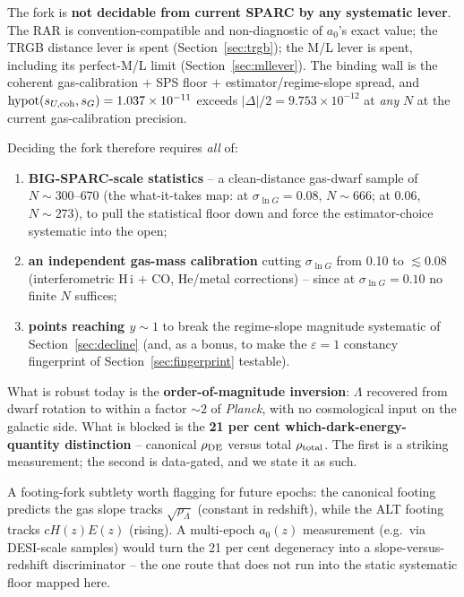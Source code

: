 \documentclass[fleqn,usenatbib]{mnras}
\begin{document}
The fork is \textbf{not decidable from current SPARC by any systematic lever}. The RAR is convention-compatible and non-diagnostic of $a_0$'s exact value; the TRGB distance lever is spent (Section~\ref{sec:trgb}); the M/L lever is spent, including its perfect-M/L limit (Section~\ref{sec:mllever}). The binding wall is the coherent gas-calibration $+$ SPS floor $+$ estimator/regime-slope spread, and $\mathrm{hypot}(s_{U,\rm coh},s_G)=1.037\times10^{-11}$ exceeds $|\Delta|/2=9.753\times10^{-12}$ at \emph{any} $N$ at the current gas-calibration precision.

Deciding the fork therefore requires \emph{all} of:
\begin{enumerate}
\item \textbf{BIG-SPARC-scale statistics} -- a clean-distance gas-dwarf sample of $N\sim300$--$670$ (the what-it-takes map: at $\sigma_{\ln G}=0.08$, $N\sim666$; at 0.06, $N\sim273$), to pull the statistical floor down and force the estimator-choice systematic into the open;
\item \textbf{an independent gas-mass calibration} cutting $\sigma_{\ln G}$ from 0.10 to $\lesssim0.08$ (interferometric H\,{\sc i} $+$ CO, He/metal corrections) -- since at $\sigma_{\ln G}=0.10$ no finite $N$ suffices;
\item \textbf{points reaching $y\sim1$} to break the regime-slope magnitude systematic of Section~\ref{sec:decline} (and, as a bonus, to make the $\varepsilon=1$ constancy fingerprint of Section~\ref{sec:fingerprint} testable).
\end{enumerate}

What is robust today is the \textbf{order-of-magnitude inversion}: $\Lambda$ recovered from dwarf rotation to within a factor ${\sim}2$ of \textit{Planck}, with no cosmological input on the galactic side. What is blocked is the \textbf{21 per cent which-dark-energy-quantity distinction} -- canonical $\rho_{\rm DE}$ versus total $\rho_{\rm total}$. The first is a striking measurement; the second is data-gated, and we state it as such.

A footing-fork subtlety worth flagging for future epochs: the canonical footing predicts the gas slope tracks $\sqrt{\rho_\Lambda}$ (constant in redshift), while the ALT footing tracks $cH(z)E(z)$ (rising). A multi-epoch $a_0(z)$ measurement (e.g.\ via DESI-scale samples) would turn the 21 per cent degeneracy into a slope-versus-redshift discriminator -- the one route that does not run into the static systematic floor mapped here.
\end{document}
